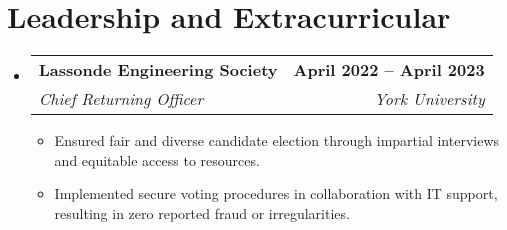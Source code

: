 \documentclass[letterpaper,11pt]{article}
\makeatletter
\newcommand{\resumeItem}[1]{
  \item\small{
    {#1 \vspace{-2pt}}
  }
}
\newcommand{\resumeSubheading}[4]{
  \vspace{-2pt}\item
    \begin{tabular*}{1.0\textwidth}[t]{l@{\extracolsep{\fill}}r}
      \textbf{#1} & \textbf{\small #2} \\
      \textit{\small#3} & \textit{\small #4} \\
    \end{tabular*}\vspace{-7pt}
}
\newcommand{\resumeSubHeadingListStart}{\begin{itemize}[leftmargin=0.0in, label={}]}
\newcommand{\resumeSubHeadingListEnd}{\end{itemize}}
\newcommand{\resumeItemListStart}{\begin{itemize}}
\newcommand{\resumeItemListEnd}{\end{itemize}\vspace{-5pt}}
\makeatother
\begin{document}
%
\section{Leadership and Extracurricular}
    \resumeSubHeadingListStart
        \resumeSubheading{Lassonde Engineering Society}{April 2022 -- April 2023}{Chief Returning Officer}{York University}
            \resumeItemListStart
                \resumeItem{Ensured fair and diverse candidate election through impartial interviews and equitable access to resources.}
                \resumeItem{Implemented secure voting procedures in collaboration with IT support, resulting in zero reported fraud or irregularities.} 
            \resumeItemListEnd
        
    \resumeSubHeadingListEnd
\end{document}
